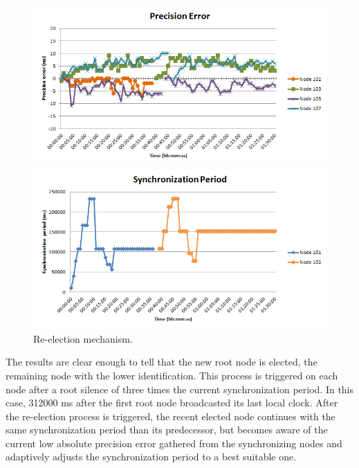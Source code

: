 \documentclass[11pt,a4]{article}
\begin{document}
\begin{multicols}{2}
\begin{figure}[!t]
\begin{minipage}[b]{0.5\linewidth}
\includegraphics[scale=0.3]{./images/13-ttsp-10ms6nodes-reelection-error.png}
\end{minipage}
\hspace{0.5cm}
\begin{minipage}[b]{0.5\linewidth}
\includegraphics[scale=0.3]{./images/14-ttsp-10ms6nodes-reelection-period.png}
\end{minipage}
\caption{Re-election mechanism.}
\label{reelection}
\end{figure}

The results are clear enough to tell that the new root node is elected, the remaining node with the lower identification. This process is triggered on each node after a root silence of three times the current synchronization period. In this case, 312000 ms after the first root node broadcasted its last local clock. After the re-election process is triggered,  the recent elected node continues with the same synchronization period than its predecessor, but becomes aware of the current low absolute precision error gathered from the synchronizing nodes and adaptively adjusts the synchronization period to a best suitable one.


\end{multicols}
\end{document}
